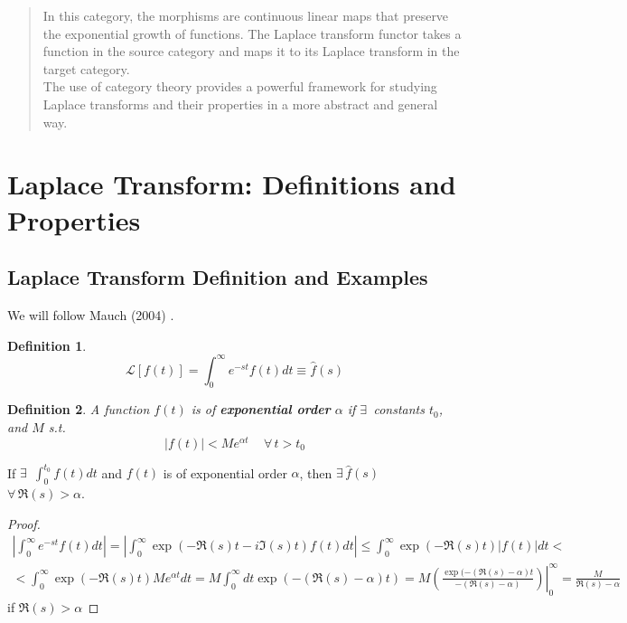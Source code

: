 \documentclass[10pt]{amsart}
\newtheorem{definition}{Definition}
\begin{document}
\begin{multicols*}{2}
\begin{quotation}
In this category, the morphisms are continuous linear maps that preserve the exponential growth of functions. The Laplace transform functor takes a function in the source category and maps it to its Laplace transform in the target category. \\

The use of category theory provides a powerful framework for studying Laplace transforms and their properties in a more abstract and general way.
\end{quotation}

\section{Laplace Transform: Definitions and Properties}

\subsection{Laplace Transform Definition and Examples}

We will follow Mauch (2004) \cite{Mauc2004}.

\begin{definition}
\begin{equation}
\mathcal{L}[f(t)] = \int_0^{\infty} e^{-st} f(t) dt \equiv \widehat{f}(s)
\end{equation}
\end{definition}

\begin{definition}
A function $f(t)$ is of \textbf{exponential order} $\alpha$ if $\exists \, $ constants $t_0$, and $M$ s.t.
\begin{equation}
|f(t) | < M e^{\alpha t} \quad \, \forall \, t > t_0
\end{equation}
\end{definition}

If $\exists \, $ $\int_0^{t_0} f(t) dt$ and $f(t)$ is of exponential order $\alpha$, then $\exists \, \widehat{f}(s)$ \, $\forall \, \Re{(s)} > \alpha$.

\begin{proof}
\[
\begin{gathered}
| \int_0^{\infty} e^{-st} f(t) dt | = | \int_0^{\infty} \exp{ (-\Re{(s)} t - i \Im{ (s)} t )} f(t) dt | \leq \int_0^{\infty} \exp{( -\Re{(s)} t)} |f(t)| dt < \\
< \int_0^{\infty} \exp{ (- \Re{(s)} t) } Me^{\alpha t} dt   = M \int_0^{\infty} dt \exp{ (- (\Re{ (s)} - \alpha ) t ) } = M \left. \left( \frac{ \exp{ (- (\Re{ (s)} - \alpha ) t} }{ - (\Re{ (s)} - \alpha ) } \right) \right|_0^{\infty} = \frac{M }{ \Re{ (s) } - \alpha }
\end{gathered}
\]
if $\Re{(s)} > \alpha$
\end{proof}


\end{multicols*}
\end{document}
